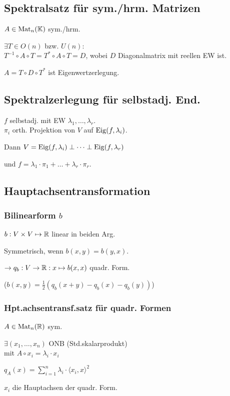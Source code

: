 \subsection*{Spektralsatz für sym./hrm. Matrizen}
$A\in\operatorname{Mat}_n(\mathbb{K})$ sym./hrm.

$\exists T\in O(n)$ bzw. $U(n):$ \\
$T^{-1}\circ A \circ T=T^*\circ A \circ T=D$,
wobei $D$ Diagonalmatrix mit reellen EW ist.

$A=T\circ D \circ T^*$ ist Eigenwertzerlegung.

\subsection*{Spektralzerlegung für selbstadj. End.}
$f$ selbstadj. mit EW $\lambda_1,\dots,\lambda_r$. \\
$\pi_i$ orth. Projektion von $V$ auf $\operatorname{Eig}(f,\lambda_i)$.

Dann $V=\operatorname{Eig}(f,\lambda_i)\perp\dots\perp \operatorname{Eig}(f,\lambda_r)$

und $f = \lambda_1\cdot\pi_1 + \dots + \lambda_r\cdot\pi_r$.

\subsection*{Hauptachsentransformation}

\subsubsection*{Bilinearform $b$}
$b:V\times V \mapsto \mathbb{R}$ linear in beiden Arg.

Symmetrisch, wenn $b(x,y)=b(y,x)$.

$\rightarrow q_b: V\to\mathbb{R}:x\mapsto b(x,x)$ quadr. Form.

($b(x,y)=\frac{1}{2}(q_b(x+y)-q_b(x)-q_b(y))$)

\subsubsection*{Hpt.achsentransf.satz für quadr. Formen}
$A\in\operatorname{Mat}_n(\mathbb{R})$ sym.

$\exists (x_1,\dots,x_n)$ ONB (Std.skalarprodukt) \\
mit $A\circ x_i = \lambda_i \cdot x_i$

$\displaystyle q_A(x)=\sum_{i=1}^n\lambda_i\cdot\langle x_i,x\rangle^2$

$x_i$ die Hauptachsen der quadr. Form.
